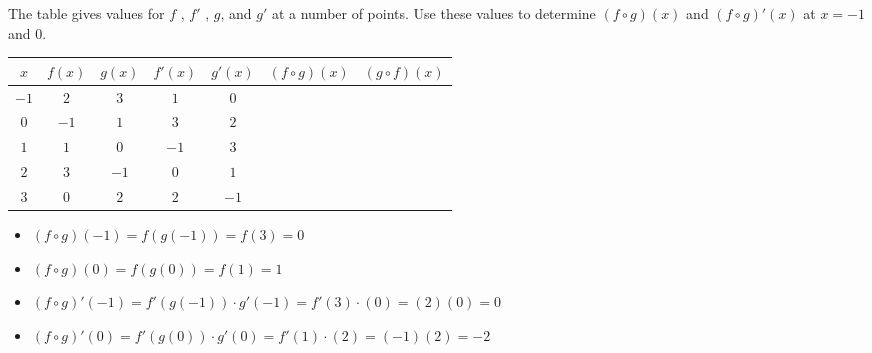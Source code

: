 \begin{example}
The table gives values for $f$ , $f'$ , $g$, and $g'$ at a number of points. Use these values to determine $( f \circ g )(x)$ and $( f \circ g ) '(x)$ at $x = -1$ and 0.
\begin{table}[ht!]
\centering
\begin{tabular}{ccccccc}
\toprule
$x$ & $f(x)$ & $g(x)$ &	$f'(x)$ & $g'(x)$ & $(f \circ g)(x)$ & $(g \circ f)(x)$ \\
\midrule
$-1$ & $2$	& $3$ &	$1$ & $0$ & & \\
$0$  & $-1$ & $1$ &	$3$ & $2$ & & \\
$1$  & $1$  & $0$ & $-1$ & $3$ & & \\
$2$	 & $3$ & $-1$ & $0$ & $1$ & & \\
$3$  & $0$ & $2$  &	$2$	& $-1$ & & \\
\bottomrule
\end{tabular}
\end{table}

\begin{solution} 
    \begin{itemize}[label={}]
    \item $(f\circ g)(-1) = f(g(-1))= f(3)=0$
    \item $(f\circ g)(0) = f(g(0))=f(1)=1$
    \item $(f\circ g)'(-1) = f'(g(-1))\cdot g'(-1)=f'(3)\cdot(0)=(2)(0)=0$ 
    \item $(f\circ g)'(0) = f'(g(0))\cdot g'(0)=f'(1)\cdot(2)=(-1)(2)=-2$
    \end{itemize}
\end{solution}\end{example}

